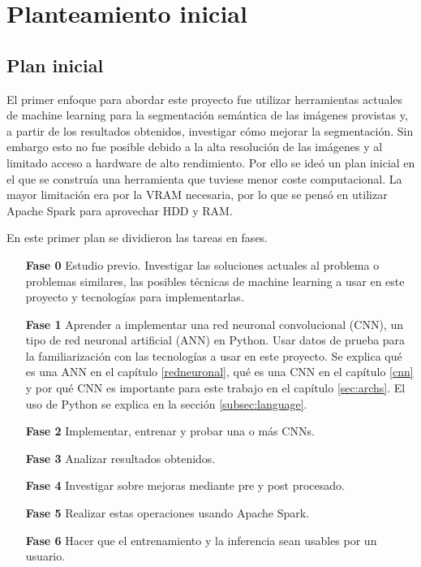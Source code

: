 \chapter{Planteamiento inicial}\label{planinicial}

\section{Plan inicial}\label{sec:planinicial}

El primer enfoque para abordar este proyecto fue utilizar herramientas actuales de machine learning para la segmentación semántica de las imágenes provistas y, a partir de los resultados obtenidos, investigar cómo mejorar la segmentación. Sin embargo esto no fue posible debido a la alta resolución de las imágenes y al limitado acceso a hardware de alto rendimiento. Por ello se ideó un plan inicial en el que se construía una herramienta que tuviese menor coste computacional. La mayor limitación era por la VRAM necesaria, por lo que se pensó en utilizar Apache Spark \cite{apachespark} para aprovechar HDD y RAM.

En este primer plan se dividieron las tareas en fases.

\begin{itemize}
\item[\textbf{Fase 0}] Estudio previo. Investigar las soluciones actuales al problema o problemas similares, las posibles técnicas de machine learning a usar en este proyecto y tecnologías para implementarlas.
\item[\textbf{Fase 1}] Aprender a implementar una red neuronal convolucional (CNN), un tipo de red neuronal artificial (ANN) en Python. Usar datos de prueba para la familiarización con las tecnologías a usar en este proyecto. Se explica qué es una ANN en el capítulo \ref{redneuronal}, qué es una CNN en el capítulo \ref{cnn} y por qué CNN es importante para este trabajo en el capítulo \ref{sec:archs}. El uso de Python se explica en la sección \ref{subsec:language}.
\item[\textbf{Fase 2}] Implementar, entrenar y probar una o más CNNs.
\item[\textbf{Fase 3}] Analizar resultados obtenidos.
\item[\textbf{Fase 4}] Investigar sobre mejoras mediante pre y post procesado.
\item[\textbf{Fase 5}] Realizar estas operaciones usando Apache Spark.
\item[\textbf{Fase 6}] Hacer que el entrenamiento y la inferencia sean usables por un usuario.
\end{itemize}

